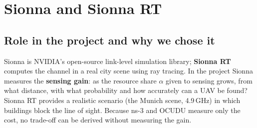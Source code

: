 \documentclass[10.5pt,a4paper]{article}
\begin{document}
\section{Sionna and Sionna RT}
\subsection{Role in the project and why we chose it}
Sionna is NVIDIA's open-source link-level simulation library; \textbf{Sionna RT} computes the channel in a real city scene using ray tracing. In the project Sionna measures the \textbf{sensing gain}: as the resource share $\alpha$ given to sensing grows, from what distance, with what probability and how accurately can a UAV be found? Sionna RT provides a realistic scenario (the Munich scene, 4.9\,GHz) in which buildings block the line of sight. Because ns-3 and OCUDU measure only the cost, no trade-off can be derived without measuring the gain.
\end{document}
